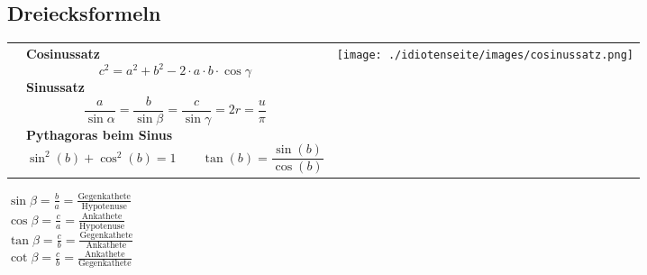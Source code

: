 \subsection{Dreiecksformeln}
\begin{tabular}{lll}
	& \parbox{9.5cm}{
		\textbf{Cosinussatz} \\
		$$c^2 = a^2 + b^2 - 2 \cdot a \cdot b \cdot \cos \gamma$$\\
		\textbf{Sinussatz} \\
		$$\frac{a}{\sin \alpha} = \frac{b}{\sin \beta} = \frac{c}{\sin \gamma} = 2r =
		\frac{u}{\pi}$$
		\textbf{Pythagoras beim Sinus}\\
		$$\sin^2(b)+\cos^2(b)=1 \qquad \tan(b)=\frac{\sin(b)}{\cos(b)}$$}
		
	& \parbox{8cm}{
		\texttt{[image: ./idiotenseite/images/cosinussatz.png]}}
\end{tabular}
\begin{center}
	\begin{multicols}{2}
		$\sin \beta = \frac ba =\frac{\text{Gegenkathete}}{\text{Hypotenuse}}$\\
		$\cos \beta = \frac ca =\frac{\text{Ankathete}}{\text{Hypotenuse}}$\\
		$\tan \beta = \frac cb =\frac{\text{Gegenkathete}}{\text{Ankathete}}$\\
		$\cot \beta = \frac cb =\frac{\text{Ankathete}}{\text{Gegenkathete}}$\\
	\end{multicols}
\end{center}

	